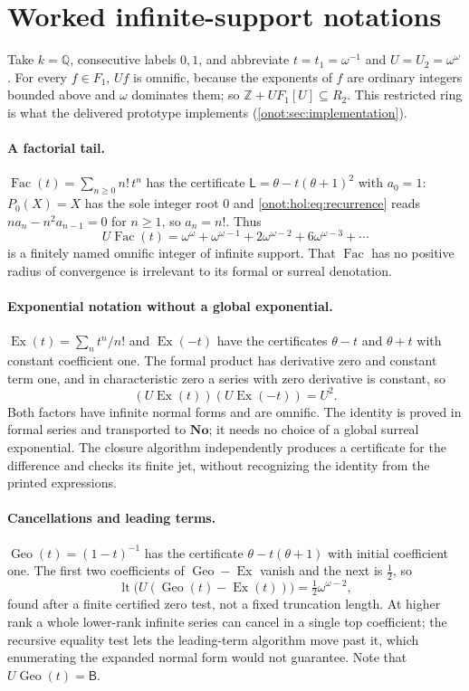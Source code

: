 \documentclass[11pt,oneside]{article}
\numberwithin{equation}{section}
\theoremstyle{definition}
\theoremstyle{remark}
\newcommand{\No}{\mathbf{No}}
\newcommand{\Z}{\mathbb Z}
\newcommand{\Q}{\mathbb Q}
\newcommand{\sB}{\mathsf B}
\newcommand{\lt}{\operatorname{lt}}
\newcommand{\Ex}{\operatorname{Ex}}
\newcommand{\Fac}{\operatorname{Fac}}
\newcommand{\Geo}{\operatorname{Geo}}
\begin{document}
\section{Worked infinite-support notations}\label{onot:hol:sec:examples}

Take $k=\Q$, consecutive labels $0,1$, and abbreviate $t=t_1=\omega^{-1}$ and
$U=U_2=\omega^\omega$. For every $f\in F_1$, $Uf$ is omnific, because the exponents
of $f$ are ordinary integers bounded above and $\omega$ dominates them; so
$\Z+UF_1[U]\subseteq R_2$. This restricted ring is what the delivered prototype
implements (\cref{onot:sec:implementation}).

\paragraph{A factorial tail.} $\Fac(t)=\sum_{n\ge0}n!\,t^n$ has the certificate
$\mathsf L=\theta-t(\theta+1)^2$ with $a_0=1$: $P_0(X)=X$ has the sole integer
root $0$ and \eqref{onot:hol:eq:recurrence} reads $na_n-n^2a_{n-1}=0$ for
$n\ge1$, so $a_n=n!$. Thus
\[
 U\Fac(t)=\omega^\omega+\omega^{\omega-1}+2\omega^{\omega-2}+6\omega^{\omega-3}+\cdots
\]
is a finitely named omnific integer of infinite support. That $\Fac$ has no
positive radius of convergence is irrelevant to its formal or surreal
denotation.

\paragraph{Exponential notation without a global exponential.}
$\Ex(t)=\sum_nt^n/n!$ and $\Ex(-t)$ have the certificates $\theta-t$ and
$\theta+t$ with constant coefficient one. The formal product has derivative zero
and constant term one, and in characteristic zero a series with zero derivative
is constant, so
\begin{equation}\label{onot:hol:eq:expidentity}
 (U\Ex(t))(U\Ex(-t))=U^2.
\end{equation}
Both factors have infinite normal forms and are omnific. The identity is proved
in formal series and transported to $\No$; it needs no choice of a global surreal
exponential. The closure algorithm independently produces a certificate for the
difference and checks its finite jet, without recognizing the identity from the
printed expressions.

\paragraph{Cancellations and leading terms.} $\Geo(t)=(1-t)^{-1}$ has the
certificate $\theta-t(\theta+1)$ with initial coefficient one. The first two
coefficients of $\Geo-\Ex$ vanish and the next is $\tfrac12$, so
\begin{equation}\label{onot:hol:eq:leadingexample}
 \lt\bigl(U(\Geo(t)-\Ex(t))\bigr)=\tfrac12\omega^{\omega-2},
\end{equation}
found after a finite certified zero test, not a fixed truncation length. At higher
rank a whole lower-rank infinite series can cancel in a single top coefficient;
the recursive equality test lets the leading-term algorithm move past it, which
enumerating the expanded normal form would not guarantee. Note that
$U\Geo(t)=\sB$.
\end{document}
